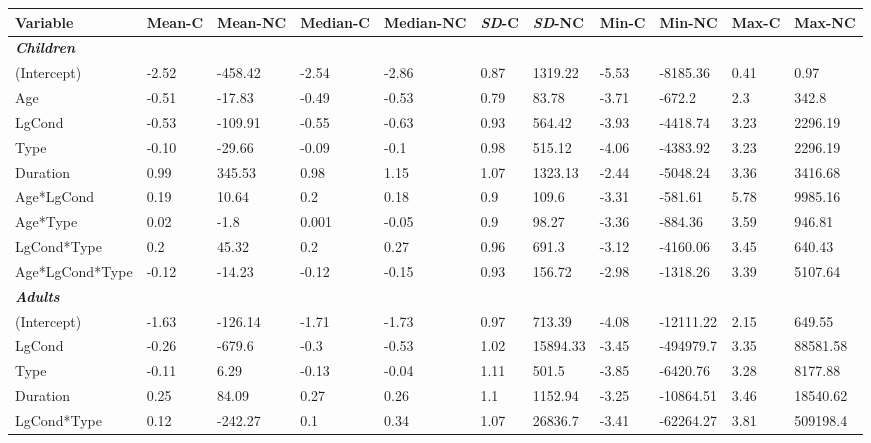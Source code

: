 \documentclass[authoryear, 12pt]{elsarticle}
\begin{document}
\begin{table}
  \begin{scriptsize}
\centering
  \begin{tabular}{lllllllllll}
    Variable 				& Mean-C & Mean-NC & Median-C & Median-NC & \textit{SD}-C & \textit{SD}-NC & Min-C & Min-NC & Max-C & Max-NC \\ 
    \hline
	\textbf{\textit{Children}} &&&&& \\
    \hline
    (Intercept)				& -2.52	& -458.42		& -2.54	& -2.86	& 0.87	& 1319.22		& -5.53	& -8185.36	& 0.41	& 0.97		\\
    Age					& -0.51	& -17.83		& -0.49	& -0.53	& 0.79	& 83.78		& -3.71	& -672.2		& 2.3		& 342.8		\\
    LgCond					& -0.53	& -109.91		& -0.55	& -0.63	& 0.93	& 564.42		& -3.93	& -4418.74	& 3.23	& 2296.19		\\
    Type					& -0.10	& -29.66		& -0.09	& -0.1	& 0.98	& 515.12		& -4.06	& -4383.92	& 3.23	& 2296.19		\\
    Duration				& 0.99	& 345.53		& 0.98	& 1.15	& 1.07	& 1323.13		& -2.44	& -5048.24	& 3.36	& 3416.68		\\
    Age*LgCond				& 0.19	& 10.64		& 0.2		& 0.18	& 0.9		& 109.6		& -3.31	& -581.61		& 5.78	& 9985.16		\\
    Age*Type				& 0.02	& -1.8		& 0.001	& -0.05	& 0.9		& 98.27		& -3.36	& -884.36		& 3.59	& 946.81		\\
    LgCond*Type			& 0.2		& 45.32		& 0.2		& 0.27	& 0.96	& 691.3		& -3.12	& -4160.06	& 3.45	& 640.43		\\
    Age*LgCond*Type		& -0.12	& -14.23		& -0.12	& -0.15	& 0.93	& 156.72		& -2.98	& -1318.26	& 3.39	& 5107.64		\\
    \hline
	\textbf{\textit{Adults}} &&&&& \\
    \hline
    (Intercept)    				& -1.63	& -126.14		& -1.71	& -1.73	& 0.97	& 713.39		& -4.08	& -12111.22	& 2.15	& 649.55		\\
    LgCond  				& -0.26	& -679.6		& -0.3	& -0.53	& 1.02	& 15894.33	& -3.45	& -494979.7	& 3.35	& 88581.58	\\
    Type 					& -0.11	& 6.29		& -0.13	& -0.04	& 1.11	& 501.5		& -3.85	& -6420.76	& 3.28	& 8177.88		\\
    Duration  				& 0.25	& 84.09		& 0.27	& 0.26	& 1.1		& 1152.94		& -3.25	& -10864.51	& 3.46	& 18540.62	\\
    LgCond*Type  			& 0.12	& -242.27		& 0.1		& 0.34	& 1.07	& 26836.7		& -3.41	& -62264.27	& 3.81	& 509198.4	\\

\end{tabular}
\end{scriptsize}
\end{table}
\end{document}
